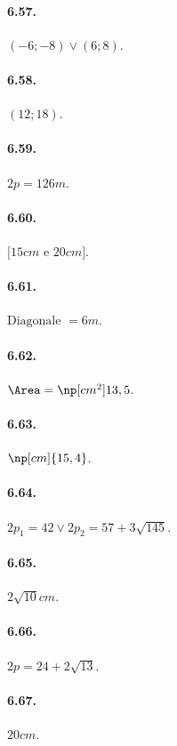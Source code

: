 \begin{multicols}{2}
\paragraph{6.57.} $(-6;-8)\vee (6;8)$.

\paragraph{6.58.} $(12;18)$.

\paragraph{6.59.} $2p=126\unit{m}$.

\paragraph{6.60.} $[15\unit{cm}$ e $20\unit{cm}]$.

\paragraph{6.61.} $\text{Diagonale }=6\unit{m}$.

\paragraph{6.62.} $\Area=\np[{cm}^2]{13,5}$.

\paragraph{6.63.} $\np[cm]{15,4}$.

\paragraph{6.64.} $2p_1=42\vee 2p_2=57+3\sqrt{145}$.

\paragraph{6.65.} $2\sqrt{10}\unit{cm}$.

\paragraph{6.66.} $2p=24+2\sqrt{13}$.

\paragraph{6.67.} $20\unit{cm}$.


\end{multicols}
